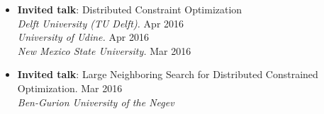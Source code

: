 \begin{itemize}
	\item {\bf Invited talk}: Distributed Constraint Optimization\\
	{\em Delft University (TU Delft).} \hfill {Apr 2016}\\
 	{\em University of Udine.} \hfill {Apr 2016} \\ 
	{\em New Mexico State University.} \hfill {Mar 2016}
	
	\item {\bf Invited talk}: Large Neighboring Search for Distributed Constrained Optimization. \hfill {Mar 2016}\\
	{\em Ben-Gurion University of the Negev}
\end{itemize}

